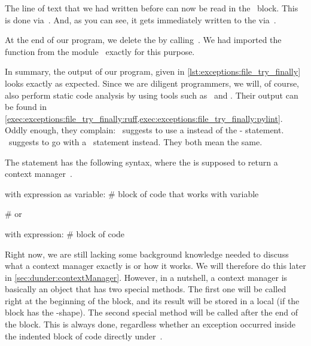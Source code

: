 The line of text that we had written before can now be read in the ~block.
This is done via~.
And, as you can see, it gets immediately written to the  via~.

At the end of our program, we delete the  by calling~.
We had imported the  function from the module~ exactly for this purpose.

In summary, the output of our program, given in \cref{lst:exceptions:file_try_finally} looks exactly as expected.
Since we are diligent programmers, we will, of course, also perform static code analysis by using tools such as \ruff\ and \pylint.
Their output can be found in \cref{exec:exceptions:file_try_finally:ruff,exec:exceptions:file_try_finally:pylint}.
Oddly enough, they complain:
\ruff\ suggests to use a  instead of the - statement.
\pylint\ suggests to go with a ~statement instead.
They both mean the same.

%
%
The  statement has the following syntax, where the  is supposed to return a context manager~\cite{PSF:P3D:TPLR:WSCM,PSF:P3D:TPSL:CUFWSC,PSF:P3D:TPLR:TWS,PEP343}.%
%
\begin{pythonSyntax}
with expression as variable:
    # block of code that works with variable

# or

with expression:
    # block of code
\end{pythonSyntax}
%
Right now, we are still lacking some background knowledge needed to discuss what a context manager exactly is or how it works.
We will therefore do this later in \cref{sec:dunder:contextManager}.
However, in a nutshell, a context manager is basically an object that has two special methods.
The first one will be called right at the beginning of the  block, and its result will be stored in a local  (if the  block has the -shape).
The second special method will be called after the end of the  block.
This is always done, regardless whether an exception occurred inside the indented block of code directly under~.

